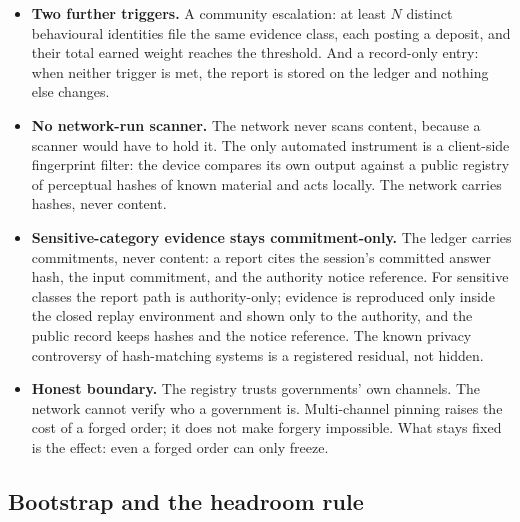 \documentclass[11pt]{article}
\begin{document}
\begin{itemize}
          window. It escrows and suspends. It never burns, never moves
          credits, never touches the artifact's measured scores. The
          freeze is reversible by the same channel or by the quorum path.
          Burning stays gated on technical correspondence, the
          replay-gated slash ladder, never a content decision.
          Confirmation is technical only: validators check the notice
          format, the ledger binding of the reported output, and replay
          equality against the frozen artifact. They never judge
          legality; the authority's notice is the determination.
    \item \textbf{Two further triggers.} A community escalation: at
          least $N$ distinct behavioural identities file the same evidence
          class, each posting a deposit, and their total earned weight
          reaches the threshold. And a record-only entry: when neither
          trigger is met, the report is stored on the ledger and nothing
          else changes.
    \item \textbf{No network-run scanner.} The network never scans
          content, because a scanner would have to hold it. The only
          automated instrument is a client-side fingerprint filter: the
          device compares its own output against a public registry of
          perceptual hashes of known material and acts locally. The
          network carries hashes, never content.
    \item \textbf{Sensitive-category evidence stays
              commitment-only.} The ledger carries commitments, never content:
          a report cites the session's committed answer hash, the input
          commitment, and the authority notice reference. For sensitive
          classes the report path is authority-only; evidence is
          reproduced only inside the closed replay environment and shown
          only to the authority, and the public record keeps hashes and
          the notice reference. The known privacy controversy of
          hash-matching systems is a registered residual, not hidden.
    \item \textbf{Honest boundary.} The registry trusts
          governments' own channels. The network cannot verify who a
          government is. Multi-channel pinning raises the cost of a forged
          order; it does not make forgery impossible. What stays fixed is
          the effect: even a forged order can only freeze.
\end{itemize}

\subsection{Bootstrap and the headroom rule}\label{sec:bootstrap}
\end{document}

